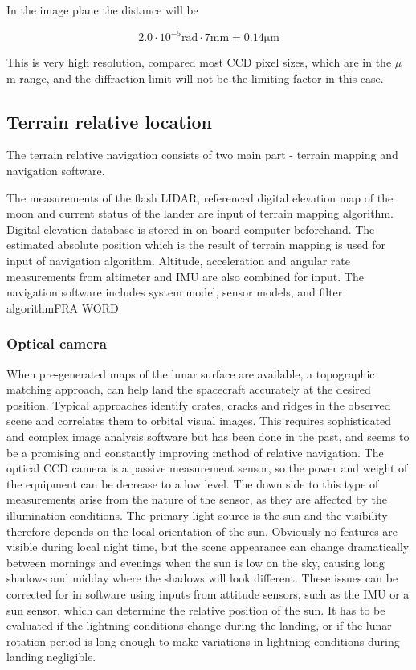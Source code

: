 In the image plane the distance will be

\begin{equation}
2.0 \cdot 10 ^{-5} \mathrm{rad} \cdot 7 \mathrm{mm} = 0.14 \mathrm{\mu m} 
\end{equation}

This is very high resolution, compared most CCD pixel sizes, which are in the $\mu$ m range, and the diffraction limit will not be the limiting factor in this case. 



\subsection{Terrain relative location}


The terrain relative navigation consists of two main part - terrain mapping and navigation software.

 The measurements of the flash LIDAR, referenced digital elevation map of the moon and current status of the lander are input of terrain mapping algorithm. Digital elevation database is stored in on-board computer beforehand. The estimated absolute position which is the result of terrain mapping is used for input of navigation algorithm. Altitude, acceleration and angular rate measurements from altimeter and IMU are also combined for input. The navigation software includes system model, sensor models, and filter algorithmFRA WORD


\subsubsection{Optical camera}

When pre-generated maps of the lunar surface are available, a topographic matching approach, can help land the spacecraft accurately at the desired position. Typical approaches identify crates, cracks and ridges in the observed scene and correlates them to orbital visual images. This requires sophisticated and complex image analysis software but has been done in the past, and seems to be a promising and constantly improving method of relative navigation. The optical CCD camera is a passive measurement sensor, so the power and weight of the equipment can be decrease to a low level. The down side to this type of measurements arise from the nature of the sensor, as they are affected by the illumination conditions. The primary light source is the sun and the visibility therefore depends on the local orientation of the sun. Obviously no features are visible during local night time, but the scene appearance can change dramatically between mornings and evenings when the sun is low on the sky, causing long shadows and midday where the shadows will look different. These issues can be corrected for in software using inputs from attitude sensors, such as the IMU or a sun sensor, which can determine the relative position of the sun. It has to be evaluated if the lightning conditions change during the landing, or if the lunar rotation period is long enough to make variations in lightning conditions during landing negligible. 


